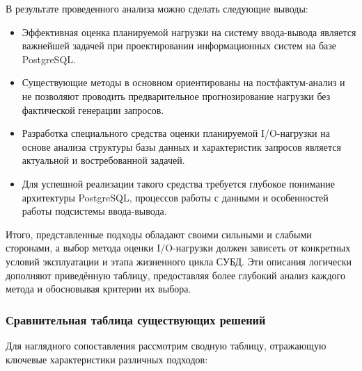 В результате проведенного анализа можно сделать следующие выводы:

\begin{itemize}
    \item Эффективная оценка планируемой нагрузки на систему ввода-вывода является важнейшей задачей при проектировании информационных систем на базе PostgreSQL.
    \item Существующие методы в основном ориентированы на постфактум-анализ и не позволяют проводить предварительное прогнозирование нагрузки без фактической генерации запросов.
    \item Разработка специального средства оценки планируемой I/O-нагрузки на основе анализа структуры базы данных и характеристик запросов является актуальной и востребованной задачей.
    \item Для успешной реализации такого средства требуется глубокое понимание архитектуры PostgreSQL, процессов работы с данными и особенностей работы подсистемы ввода-вывода.
\end{itemize}

Итого, представленные подходы обладают своими сильными и слабыми сторонами, а выбор метода оценки I/O-нагрузки должен зависеть 
от конкретных условий эксплуатации и этапа жизненного цикла СУБД. Эти описания логически дополняют приведённую таблицу, 
предоставляя более глубокий анализ каждого метода и обосновывая критерии их выбора.


\subsubsection{Сравнительная таблица существующих решений}

Для наглядного сопоставления рассмотрим сводную таблицу, отражающую ключевые характеристики различных подходов:

